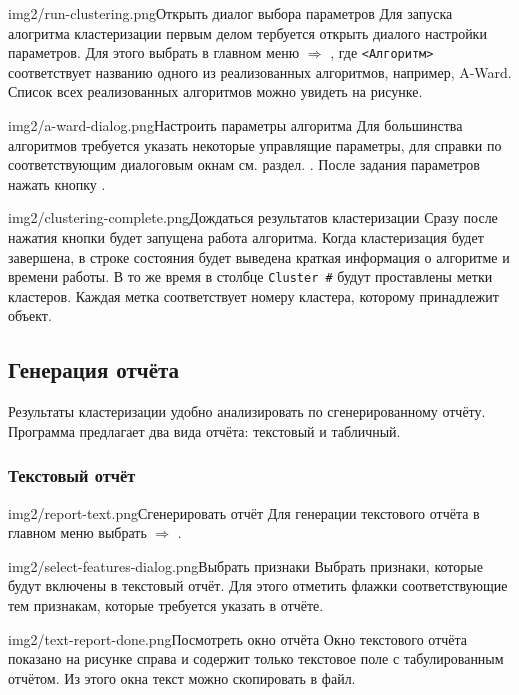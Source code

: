 \documentclass[12pt,tikz]{instruction}
\begin{document}
\begin{steps}
	\begin{ist}{img2/run-clustering.png}{Открыть диалог выбора параметров}
		Для запуска алогритма кластеризации первым делом тербуется открыть диалого настройки параметров. Для этого выбрать в главном меню  $\Rightarrow$ , где \texttt{<Алгоритм>} соответствует названию одного из реализованных алгоритмов, например, A-Ward. Список всех реализованных алгоритмов можно увидеть на рисунке.
	\end{ist}
	\begin{ist}{img2/a-ward-dialog.png}{Настроить параметры алгоритма}
		Для большинства алгоритмов требуется указать некоторые управлящие параметры, для справки по соответствующим диалоговым окнам см. раздел. . После задания параметров нажать кнопку .
	\end{ist}
	\begin{ist}{img2/clustering-complete.png}{Дождаться результатов кластеризации}
		Сразу после нажатия кнопки  будет запущена работа алгоритма.
		Когда кластеризация будет завершена, в строке состояния будет выведена краткая информация о алгоритме и времени работы. В то же время в столбце \texttt{Cluster \#} будут проставлены метки кластеров. Каждая метка соответствует номеру кластера, которому принадлежит объект.
	\end{ist}
		
\end{steps}

\subsection{Генерация отчёта}
\label{subsec:report}
Результаты кластеризации удобно анализировать по сгенерированному отчёту. Программа \SysName предлагает два вида отчёта: текстовый и табличный.

\subsubsection{Текстовый отчёт}
\begin{steps}
	\begin{ist}{img2/report-text.png}{Сгенерировать отчёт}
		Для генерации текстового отчёта в главном меню выбрать  $\Rightarrow$ .
	\end{ist}
	\begin{ist}{img2/select-features-dialog.png}{Выбрать признаки}
		Выбрать признаки, которые будут включены в текстовый отчёт. Для этого отметить флажки соответствующие тем признакам, которые требуется указать в отчёте. \vspace{2.5cm}
	\end{ist}
	
	\begin{ist}{img2/text-report-done.png}{Посмотреть окно отчёта}
		Окно текстового отчёта показано на рисунке справа и содержит только текстовое поле с табулированным отчётом. Из этого окна текст можно скопировать в файл.
	\end{ist}
		
\end{steps}
\end{document}
